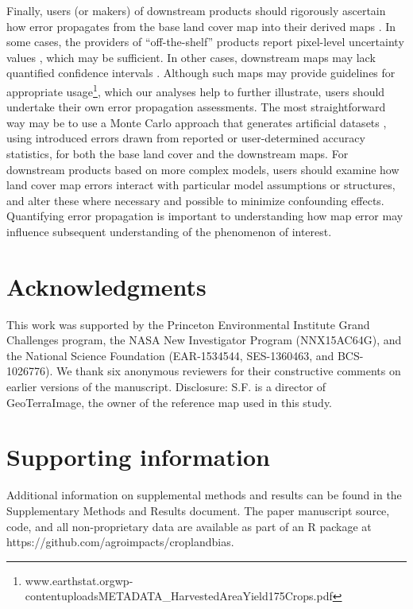 \documentclass[12 pt, titlepage, a4paper]{article}
\begin{document}
Finally, users (or makers) of downstream products should rigorously ascertain how error propagates from the base land cover map into their derived maps \citep{verburg_challenges_2011}. In some cases, the providers of ``off-the-shelf'' products report pixel-level uncertainty values \citep[e.g.][]{ramankutty_farming_2008}, which may be sufficient.  In other cases, downstream maps may lack quantified confidence intervals \citep[e.g.][]{monfreda_farming_2008}. Although such maps may provide guidelines for appropriate usage\footnote{www.earthstat.org\/wp-content\/uploads\/METADATA\_HarvestedAreaYield175Crops.pdf}, which our analyses help to further illustrate, users should undertake their own error propagation assessments. The most straightforward way may be to use a Monte Carlo approach that generates artificial datasets \citep[e.g.][]{avelino_goldilocks_2016}, using introduced errors drawn from reported or user-determined accuracy statistics, for both the base land cover and the downstream maps. For downstream products based on more complex models, users should examine how land cover map errors interact with particular model assumptions or structures, and alter these where necessary and possible to minimize confounding effects. Quantifying error propagation is important to understanding how map error may influence subsequent understanding of the phenomenon of interest. 

\vspace{-0.3 cm}
\section*{Acknowledgments}
\vspace{-0.2 cm}
This work was supported by the Princeton Environmental Institute Grand Challenges program, the NASA New Investigator Program (NNX15AC64G), and the National Science Foundation (EAR-1534544, SES-1360463, and BCS-1026776). We thank six anonymous reviewers for their constructive comments on earlier versions of the manuscript. Disclosure: S.F. is a director of GeoTerraImage, the owner of the reference map used in this study. 

\section*{Supporting information}
Additional information on supplemental methods and results can be found in the Supplementary Methods and Results document. The paper manuscript source, code, and all non-proprietary data are available as part of an R package at https://github.com/agroimpacts/croplandbias.
\end{document}
